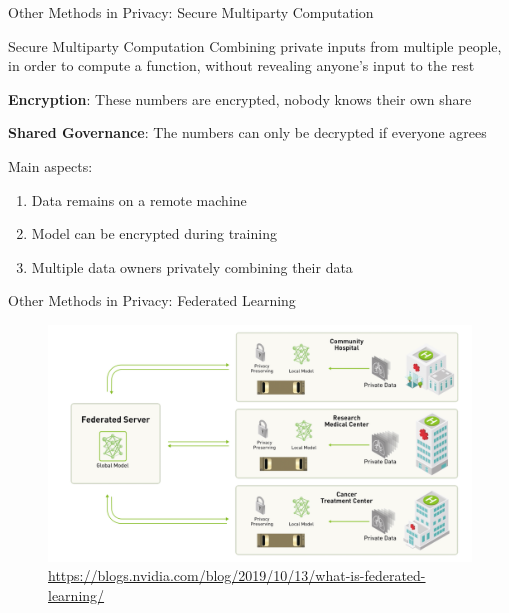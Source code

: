 \documentclass[12pt,aspectratio=169]{beamer}
\begin{document}
\begin{frame}{Other Methods in Privacy: Secure Multiparty Computation}

\begin{block}{Secure Multiparty Computation}
Combining private inputs from multiple people, in order to compute a function, without revealing anyone's input to the rest
\end{block}

\textbf{Encryption}: These numbers are encrypted, nobody knows their own share

\textbf{Shared Governance}: The numbers can only be decrypted if everyone agrees

Main aspects:
\begin{enumerate}
    \item Data remains on a remote machine
    \item Model can be encrypted during training
    \item Multiple data owners privately combining their data
\end{enumerate}

\end{frame}

\begin{frame}{Other Methods in Privacy: Federated Learning}

\begin{figure}
    \centering
    \includegraphics[width=0.85\linewidth]{figures/federated-learning.png}
    \caption{\tiny \url{https://blogs.nvidia.com/blog/2019/10/13/what-is-federated-learning/}}
\end{figure}

\end{frame}
\end{document}
